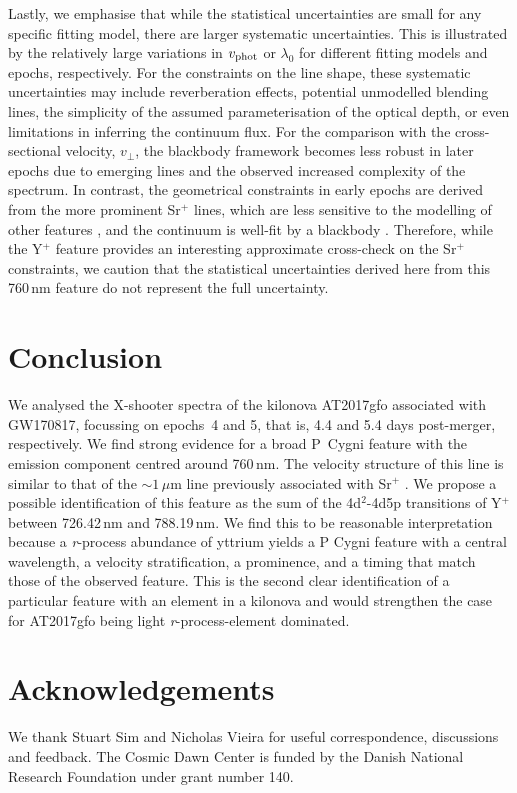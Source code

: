 \documentclass{aa}
\newcommand{\rproc}{\textit{r}-process\xspace}
\begin{document}
Lastly, we emphasise that while the statistical uncertainties are small for any specific fitting model, there are larger systematic uncertainties. This is illustrated by the relatively large variations in $v_{\rm phot}$ or $\lambda_0$ for different fitting models and epochs, respectively. For the constraints on the line shape, these systematic uncertainties may include reverberation effects, potential unmodelled blending lines, the simplicity of the assumed parameterisation of the optical depth, or even limitations in inferring the continuum flux. For the comparison with the cross-sectional velocity, $v_\perp$, the blackbody framework becomes less robust in later epochs due to emerging lines and the observed increased complexity of the spectrum. In contrast, the geometrical constraints in early epochs are derived from the more prominent Sr\(^+\) lines, which are less sensitive to the modelling of other features \citep{Sneppen2023}, and the continuum is well-fit by a blackbody \citep{Sneppen2023_bb}.
Therefore, while the Y\(^+\) feature provides an interesting approximate cross-check on the Sr\(^+\) constraints, we caution that the statistical uncertainties derived here from this 760\,nm feature do not represent the full uncertainty.


\section{Conclusion}
We analysed the X-shooter spectra of the kilonova AT2017gfo associated with GW170817, focussing on epochs~4 and 5, that is, 4.4 and 5.4 days post-merger, respectively. We find strong evidence for a broad P~Cygni feature with the emission component centred around 760\,nm. The velocity structure of this line is similar to that of the $\sim 1\,\mu$m line previously associated with Sr\(^+\) \citep{Watson2019}. We propose a possible identification of this feature as the sum of the 4d$^2$-4d5p transitions of Y\(^+\) between 726.42\,nm and 788.19\,nm. 
We find this to be reasonable interpretation because a \rproc abundance of yttrium yields a P Cygni feature with a central wavelength, a velocity stratification, a prominence, and a timing that match those of the observed feature.
This is the second clear identification of a particular feature with an element in a kilonova and would strengthen the case for AT2017gfo being light \rproc-element dominated.

\section{Acknowledgements}
We thank Stuart Sim and Nicholas Vieira for useful correspondence, discussions and feedback. The Cosmic Dawn Center is funded by the Danish National Research Foundation under grant number 140.  
\end{document}
